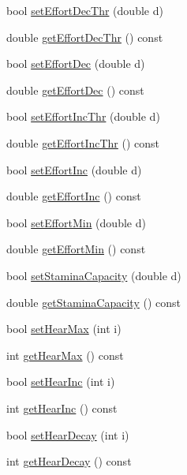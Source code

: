 \begin{DoxyCompactItemize}
\item 
bool \hyperlink{classServerSettings_a2a117997fc3df014bfdcb6de4a5fb900}{set\+Effort\+Dec\+Thr} (double d)
\item 
double \hyperlink{classServerSettings_a893754dba565851222cc07837f2eb677}{get\+Effort\+Dec\+Thr} () const 
\item 
bool \hyperlink{classServerSettings_a6adceb77055029c4f935e5b70c864185}{set\+Effort\+Dec} (double d)
\item 
double \hyperlink{classServerSettings_a7f068005fc8d39929081bb4d9f2849a0}{get\+Effort\+Dec} () const 
\item 
bool \hyperlink{classServerSettings_ac2d9af5b8702d95cf47101d20f456ec8}{set\+Effort\+Inc\+Thr} (double d)
\item 
double \hyperlink{classServerSettings_a44bb9d79de2677620f8fd4db0201b2c3}{get\+Effort\+Inc\+Thr} () const 
\item 
bool \hyperlink{classServerSettings_a2339ec254951b15f5acfeff06d7b22a2}{set\+Effort\+Inc} (double d)
\item 
double \hyperlink{classServerSettings_a77b69873f26abdfcbf8564f59be19c50}{get\+Effort\+Inc} () const 
\item 
bool \hyperlink{classServerSettings_a8c2f66a7d2c5619848bb924564a4a5a2}{set\+Effort\+Min} (double d)
\item 
double \hyperlink{classServerSettings_a93d574fac0f46743eb79e49ce4d4fcf2}{get\+Effort\+Min} () const 
\item 
bool \hyperlink{classServerSettings_ac313b6695ef99dc74439f3e5d0d56a73}{set\+Stamina\+Capacity} (double d)
\item 
double \hyperlink{classServerSettings_aac0d2476d085fe056b7033670552e170}{get\+Stamina\+Capacity} () const 
\item 
bool \hyperlink{classServerSettings_a949653e100ea22a093990c895a332a4e}{set\+Hear\+Max} (int i)
\item 
int \hyperlink{classServerSettings_a3e13dc98ccc359583eb774325cdaacda}{get\+Hear\+Max} () const 
\item 
bool \hyperlink{classServerSettings_a08fc847141bf9820c593a9b7c29b1b1d}{set\+Hear\+Inc} (int i)
\item 
int \hyperlink{classServerSettings_a9dca9bb073ad15c88517f7c038611d37}{get\+Hear\+Inc} () const 
\item 
bool \hyperlink{classServerSettings_a9a78fef09f0f231d5def44c2096ae5d1}{set\+Hear\+Decay} (int i)
\item 
int \hyperlink{classServerSettings_aef634b9253fade25b8ae02aa4773338c}{get\+Hear\+Decay} () const 

\end{DoxyCompactItemize}
